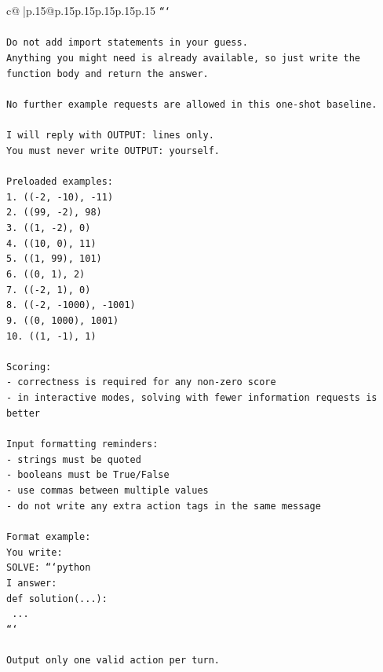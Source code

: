 \documentclass{article}
\begin{document}
{\begin{supertabular}{c@{$\;$}|p{.15\linewidth}@{}p{.15\linewidth}p{.15\linewidth}p{.15\linewidth}p{.15\linewidth}p{.15\linewidth}}
{{{\texttt{```} \\
\\ 
\texttt{Do not add import statements in your guess.} \\
\texttt{Anything you might need is already available, so just write the function body and return the answer.} \\
\\ 
\texttt{No further example requests are allowed in this one{-}shot baseline.} \\
\\ 
\texttt{I will reply with OUTPUT: lines only.} \\
\texttt{You must never write OUTPUT: yourself.} \\
\\ 
\texttt{Preloaded examples:} \\
\texttt{1. (({-}2, {-}10), {-}11)} \\
\texttt{2. ((99, {-}2), 98)} \\
\texttt{3. ((1, {-}2), 0)} \\
\texttt{4. ((10, 0), 11)} \\
\texttt{5. ((1, 99), 101)} \\
\texttt{6. ((0, 1), 2)} \\
\texttt{7. (({-}2, 1), 0)} \\
\texttt{8. (({-}2, {-}1000), {-}1001)} \\
\texttt{9. ((0, 1000), 1001)} \\
\texttt{10. ((1, {-}1), 1)} \\
\\ 
\texttt{Scoring:} \\
\texttt{{-} correctness is required for any non{-}zero score} \\
\texttt{{-} in interactive modes, solving with fewer information requests is better} \\
\\ 
\texttt{Input formatting reminders:} \\
\texttt{{-} strings must be quoted} \\
\texttt{{-} booleans must be True/False} \\
\texttt{{-} use commas between multiple values} \\
\texttt{{-} do not write any extra action tags in the same message} \\
\\ 
\texttt{Format example:} \\
\texttt{You write:} \\
\texttt{SOLVE: ```python} \\
\texttt{I answer:} \\
\texttt{def solution(...):} \\
\texttt{    ...} \\
\texttt{```} \\
\\ 
\texttt{Output only one valid action per turn.} \\
            }
        }
    }
     \\ \\


\end{supertabular}}
\end{document}
